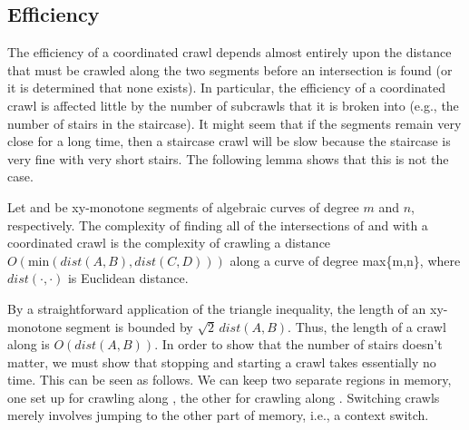 \subsection{Efficiency}
%
%
%
%
The efficiency of a coordinated crawl depends almost entirely 
upon the distance that must be crawled along the two segments before 
an intersection is found (or it is determined that none exists).
In particular, the efficiency of a coordinated crawl is affected little by
the number of subcrawls that it is broken into 
(e.g., the number of stairs in the staircase).
It might seem that if the segments remain very close
for a long time, then a staircase crawl will be slow because
the staircase is very fine with very short stairs. 
The following lemma shows that this is not the case.
%
%
\begin{lemma}
\label{lem-9}
Let  and  be xy-monotone segments of algebraic 
curves of degree $m$ and $n$, respectively.
The complexity of finding all of the intersections of  and  
with a coordinated crawl is the complexity of crawling a distance
$O(\mbox{min}(dist(A,B), dist(C,D)))$ along a curve of degree max\{m,n\},
where $dist(\cdot,\cdot)$ is Euclidean distance.
\end{lemma}

By a straightforward application of the triangle inequality,
the length of an xy-monotone segment  is bounded by $\sqrt{2}\,dist(A,B)$.
Thus, the length of a crawl along  is $O(dist(A,B))$.
In order to show that the number of stairs doesn't matter,
we must show that stopping and starting a crawl takes essentially no time.
This can be seen as follows.
We can keep two separate regions in memory, one set up for crawling
along , the other for crawling along .
Switching crawls merely involves jumping to the other part of memory,
i.e., a context switch.
\QED
{} %

